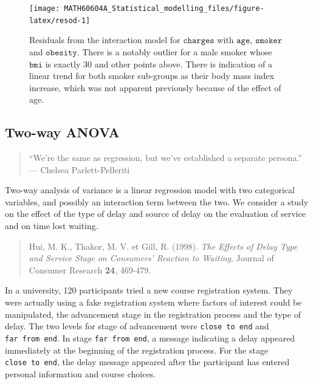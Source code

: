 \documentclass[
  11pt,
  letterpaper,
]{book}
\theoremstyle{definition}
\theoremstyle{definition}
\theoremstyle{definition}
\theoremstyle{remark}
\begin{document}
\begin{figure}

{\centering \texttt{[image: MATH60604A\_Statistical\_modelling\_files/figure-latex/resod-1]} 

}

\caption{Residuals from the interaction model for $\texttt{charges}$ with $\texttt{age}$, $\texttt{smoker}$ and $\texttt{obesity}$. There is a notably outlier for a male smoker whose $\texttt{bmi}$ is exactly 30 and other points above. There is indication of a linear trend for both smoker sub-groups as their body mass index increase, which was not apparent previously because of the effect of age.}\label{fig:resod}
\end{figure}

\hypertarget{two-way-anova}{%
\subsection{Two-way ANOVA}\label{two-way-anova}}

\begin{quote}
``We're the same as regression, but we've established a separate persona.'' --- Chelsea Parlett-Pelleriti
\end{quote}

Two-way analysis of variance is a linear regression model with two categorical variables, and possibly an interaction term between the two. We consider a study on the effect of the type of delay and source of delay on the evaluation of service and on time lost waiting.

\begin{quote}
Hui, M. K., Thakor, M. V. et Gill, R. (1998). \emph{The Effects of Delay Type and Service Stage on Consumers' Reaction to Waiting}. Journal of Consumer Research \textbf{24}, 469-479.
\end{quote}

In a university, 120 participants tried a new course registration system. They were actually using a fake registration system where factors of interest could be manipulated, the advancement stage in the registration process and the type of delay. The two levels for stage of advancement were \texttt{close\ to\ end} and \texttt{far\ from\ end}. In stage \texttt{far\ from\ end}, a message indicating a delay appeared immediately at the beginning of the registration process. For the stage \texttt{close\ to\ end}, the delay message appeared after the participant has entered personal information and course choices.
\end{document}
